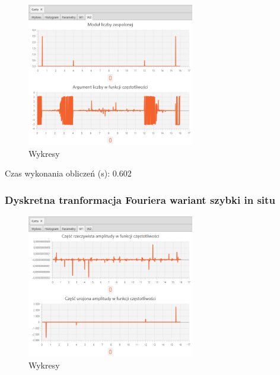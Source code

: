 \documentclass[12pt]{article}
\begin{document}
{{{                \begin{figure}[H]
                    \centering
                    \includegraphics[width=0.65\textwidth]{img/result/s3/01/W2_draw_1_sinus_sampling_trans_s3_data_205856.png}
                    \caption{Wykresy}
                \end{figure}

                Czas wykonania obliczeń (s): 0.602
            }
            \newpage

            \subsubsection{Dyskretna tranformacja Fouriera wariant szybki in situ} {

                \begin{figure}[H]
                    \centering
                    \includegraphics[width=0.65\textwidth]{img/result/s3/02/W1_draw_2_sinus_sampling_trans_s3_data_205903.png}
                    \caption{Wykresy}
                \end{figure}

}}}
\end{document}
